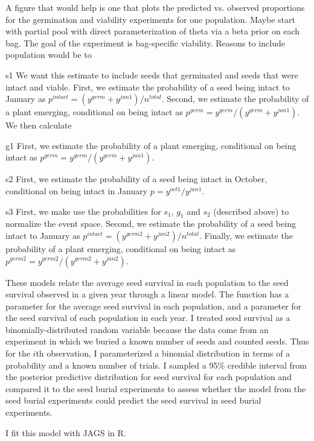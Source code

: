 \documentclass[12pt, oneside, titlepage]{article}   	%
\begin{document}
A figure that would help is one that plots the predicted vs. observed proportions for the germination and viability experiments for one population. 
 Maybe start with partial pool with direct parameterization of theta via a beta prior on each bag. The goal of the experiment is bag-specific viability. Reasons to include population would be to
 
 s1 We want this estimate to include seeds that germinated and seeds that were intact and viable. First, we estimate the probability of a seed being intact to January as $p^{intact} = (y^{germ}+y^{jan1})/n^{total}$. Second, we estimate the probability of a plant emerging, conditional on being intact as $p^{germ} = y^{germ}/(y^{germ}+y^{jan1})$. We then calculate 

g1 First, we estimate the probability of a plant emerging, conditional on being intact as $p^{germ} = y^{germ}/(y^{germ}+y^{jan1})$. 

s2 First, we estimate the probability of a seed being intact in October, conditional on being intact in January $ p = y^{oct1} / y^{jan1} $.

s3  First, we make use the probabilities for $s_1$, $g_1$ and $s_2$ (described above) to normalize the event space. Second, we estimate the probability of a seed being intact to January as $p^{intact} = (y^{germ2}+y^{jan2})/n^{total}$. Finally, we estimate the probability of a plant emerging, conditional on being intact as $p^{germ2} = y^{germ2}/(y^{germ2}+y^{jan2})$. 

These models relate the average seed survival in each population to the seed survival observed in a given year through a linear model. The function has a parameter for the average seed survival in each population, and a parameter for the seed survival of each population in each year. I treated seed survival as a binomially-distributed random variable because the data come from an experiment in which we buried a known number of seeds and counted seeds. Thus for the $i$th observation, I parameterized a binomial distribution in terms of a probability and a known number of trials. I sampled a 95\% credible interval from the posterior predictive distribution for seed survival for each population and compared it to the seed burial experiments to assess whether the model from the seed burial experiments could predict the seed survival in seed burial experiments. 

I fit this model with JAGS in R. %
\fi
\end{document}
